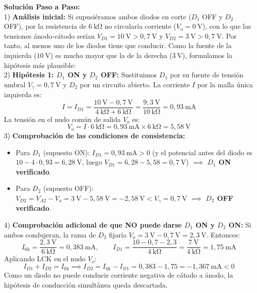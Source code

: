 \begin{ejercicio}
\textbf{Solución Paso a Paso:}\\[4pt]
1) \textbf{Análisis inicial:} Si supusiéramos ambos diodos en corte ($D_1$ OFF y $D_2$ OFF), por la resistencia de $6\ \si{\kilo\ohm}$ no circularía corriente ($V_o = 0\ \si{\volt}$), con lo que las tensiones ánodo-cátodo serían $V_{D1} = 10\ \si{\volt} > 0{,}7\ \si{\volt}$ y $V_{D2} = 3\ \si{\volt} > 0{,}7\ \si{\volt}$. Por tanto, al menos uno de los diodos tiene que conducir. Como la fuente de la izquierda ($10\ \si{\volt}$) es mucho mayor que la de la derecha ($3\ \si{\volt}$), formulamos la hipótesis más plausible:\\[4pt]
2) \textbf{Hipótesis 1: $D_1$ ON y $D_2$ OFF:}
Sustituimos $D_1$ por su fuente de tensión umbral $V_\gamma = 0{,}7\ \si{\volt}$ y $D_2$ por un circuito abierto. La corriente $I$ por la malla única izquierda es:
\begin{equation}
    I = I_{D1} = \frac{10\ \si{\volt} - 0{,}7\ \si{\volt}}{4\ \si{\kilo\ohm} + 6\ \si{\kilo\ohm}} = \frac{9{,}3\ \si{\volt}}{10\ \si{\kilo\ohm}} = 0{,}93\ \si{\milli\ampere}
\end{equation}
La tensión en el nudo común de salida $V_o$ es:
\begin{equation}
    \boxed{V_o = I \cdot 6\ \si{\kilo\ohm} = 0{,}93\ \si{\milli\ampere} \times 6\ \si{\kilo\ohm} = 5{,}58\ \si{\volt}}
\end{equation}
3) \textbf{Comprobación de las condiciones de consistencia:}
\begin{itemize}[leftmargin=*]
    \item Para $D_1$ (supuesto ON): $I_{D1} = 0{,}93\ \si{\milli\ampere} > 0$ (y el potencial antes del diodo es $10 - 4 \cdot 0{,}93 = 6{,}28\ \si{\volt}$, luego $V_{D1} = 6{,}28 - 5{,}58 = 0{,}7\ \si{\volt}$) $\implies$ \textbf{$D_1$ ON verificado}.
    \item Para $D_2$ (supuesto OFF): $V_{D2} = V_{A2} - V_o = 3\ \si{\volt} - 5{,}58\ \si{\volt} = -2{,}58\ \si{\volt} < V_\gamma = 0{,}7\ \si{\volt}$ $\implies$ \textbf{$D_2$ OFF verificado}.
\end{itemize}
4) \textbf{Comprobación adicional de que NO puede darse $D_1$ ON y $D_2$ ON:}
Si ambos condujeran, la rama de $D_2$ fijaría $V_o = 3\ \si{\volt} - 0{,}7\ \si{\volt} = 2{,}3\ \si{\volt}$. Entonces:
\begin{equation}
    I_{6\text{k}} = \frac{2{,}3\ \si{\volt}}{6\ \si{\kilo\ohm}} = 0{,}383\ \si{\milli\ampere}, \qquad I_{D1} = \frac{10 - 0{,}7 - 2{,}3}{4\ \si{\kilo\ohm}} = \frac{7\ \si{\volt}}{4\ \si{\kilo\ohm}} = 1{,}75\ \si{\milli\ampere}
\end{equation}
Aplicando LCK en el nudo $V_o$:
\begin{equation}
    I_{D1} + I_{D2} = I_{6\text{k}} \implies I_{D2} = I_{6\text{k}} - I_{D1} = 0{,}383 - 1{,}75 = -1{,}367\ \si{\milli\ampere} < 0
\end{equation}
Como un diodo no puede conducir corriente negativa de cátodo a ánodo, la hipótesis de conducción simultánea queda descartada.
\end{ejercicio}


